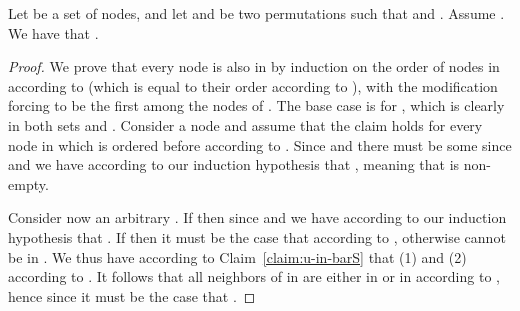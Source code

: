 \begin{claim}
\label{claim:sigma-pi}
Let  be a set of nodes, and let  and  be two permutations such that  and . Assume . We have that .
\end{claim}
\begin{proof}
We prove that every node  is also in  by induction on the order of nodes in  according to  (which is equal to their order according to ), with the modification forcing  to be the first among the nodes of .
The base case is for , which is clearly in both sets  and .
Consider a node  and assume that the claim holds for every node in  which is ordered before  according to .
Since  and  there must be some  since  and  we have according to our induction hypothesis that , meaning that  is non-empty.

Consider now an arbitrary . If  then since  and  we have according to our induction hypothesis that . If  then it must be the case that  according to , otherwise  cannot be in . We thus have according to Claim~\ref{claim:u-in-barS} that (1)  and (2)  according to . It follows that all neighbors of  in  are either in  or in  according to , hence since  it must be the case that .
\end{proof}





